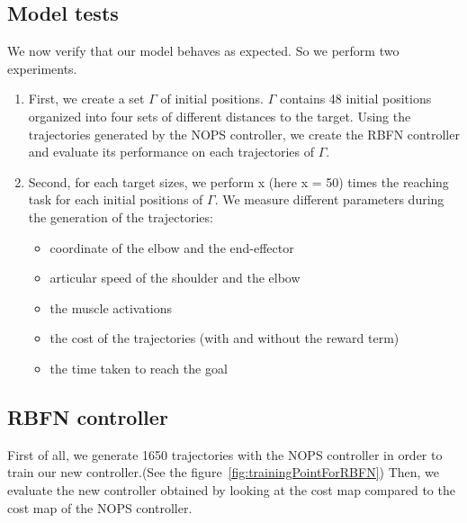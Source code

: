 \documentclass[pdftex,a4paper,11pt]{report}
\begin{document}
\subsection{Model tests}
We now verify that our model behaves as expected. So we perform two experiments.
\begin{enumerate}
\item First, we create a set $\Gamma$ of initial positions. $\Gamma$ contains 48 initial positions organized into four sets of different distances to the target.
Using the trajectories generated by the NOPS controller, we create the RBFN controller and evaluate its performance on each trajectories of $\Gamma$.
\item Second, for each target sizes, we perform x (here x = 50) times the reaching task for each initial positions of $\Gamma$. We measure different parameters during the generation of the trajectories:
\begin{itemize}
\item coordinate of the elbow and the end-effector
\item articular speed of the shoulder and the elbow
\item the muscle activations
\item the cost of the trajectories (with and without the reward term)
\item the time taken to reach the goal
\end{itemize}
\end{enumerate}

\subsection{RBFN controller}
First of all, we generate 1650 trajectories with the NOPS controller in order to train our new controller.(See the figure~\ref{fig:trainingPointForRBFN})
Then, we evaluate the new controller obtained by looking at the cost map compared to the cost map of the NOPS controller.
\end{document}
